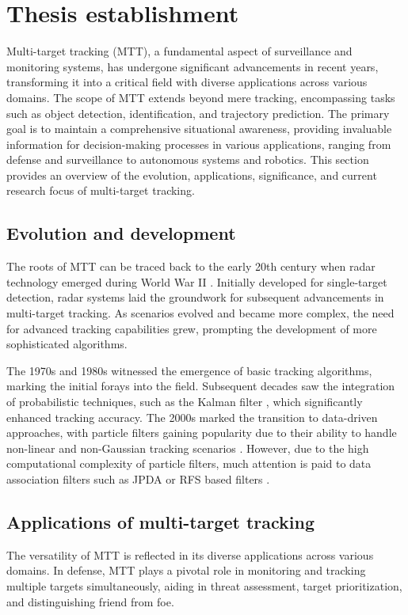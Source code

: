 \chapter{Thesis establishment}
Multi-target tracking (MTT), a fundamental aspect of surveillance and monitoring systems, has undergone significant advancements in recent years, transforming it into a critical field with diverse applications across various domains.
The scope of MTT extends beyond mere tracking, encompassing tasks such as object detection, identification, and trajectory prediction. The primary goal is to maintain a comprehensive situational awareness, providing invaluable information for decision-making processes in various applications, ranging from defense and surveillance to autonomous systems and robotics.
This section provides an overview of the evolution, applications, significance, and current research focus of multi-target tracking.
\section{Evolution and development}
The roots of MTT can be traced back to the early 20th century when radar technology emerged during World War II \cite{bar1995}. Initially developed for single-target detection, radar systems laid the groundwork for subsequent advancements in multi-target tracking. As scenarios evolved and became more complex, the need for advanced tracking capabilities grew, prompting the development of more sophisticated algorithms.

The 1970s and 1980s witnessed the emergence of basic tracking algorithms, marking the initial forays into the field. Subsequent decades saw the integration of probabilistic techniques, such as the Kalman filter \cite{kalmanFilter}, which significantly enhanced tracking accuracy. The 2000s marked the transition to data-driven approaches, with particle filters gaining popularity due to their ability to handle non-linear and non-Gaussian tracking scenarios \cite{nonlinearParticleFilter}. However, due to the high computational complexity of particle filters, much attention is paid to data association filters such as JPDA \cite{brekke} or RFS based filters \cite{mahler}.

\section{Applications of multi-target tracking}
The versatility of MTT is reflected in its diverse applications across various domains. In defense, MTT plays a pivotal role in monitoring and tracking multiple targets simultaneously, aiding in threat assessment, target prioritization, and distinguishing friend from foe.

